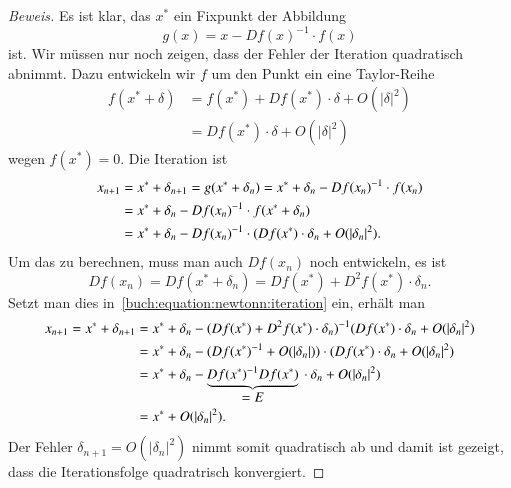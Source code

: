 \begin{proof}[Beweis]
Es ist klar, das $x^*$ ein Fixpunkt der Abbildung
\[
g(x)=x-Df(x)^{-1}\cdot f(x)
\]
ist.
Wir müssen nur noch zeigen, dass der Fehler der Iteration quadratisch
abnimmt.
Dazu entwickeln wir $f$ um den Punkt ein eine Taylor-Reihe
\begin{align*}
f(x^* + \delta)
&=
f(x^*) + Df(x^*)\cdot \delta + O(|\delta|^2)
\\
&=
Df(x^*)\cdot \delta + O(|\delta|^2)
\end{align*}
wegen $f(x^*)=0$.
Die Iteration ist
\begin{align}
x_{n+1}
&=
x^* +\delta_{n+1}
=
g(x^*+\delta_n)
=
x^*+\delta_n  - Df(x_n)^{-1}\cdot f(x_n)
\notag
\\
&=
x^* + \delta_n -Df(x_n)^{-1}\cdot f(x^* + \delta_n)
\notag
\\
&=
x^* + \delta_n -Df(x_n)^{-1}\cdot
(Df(x^*)\cdot \delta_n + O(|\delta_n|^2).
\label{buch:equation:newtonn:iteration}
\end{align}
Um das zu berechnen, muss man auch $Df(x_n)$ noch entwickeln, es ist
\[
Df(x_n)
=
Df(x^*+\delta_n)
=
Df(x^*) + D^2f(x^*)\cdot\delta_n.
\]
Setzt man dies in~\eqref{buch:equation:newtonn:iteration} ein, erhält man
\begin{align*}
x_{n+1}
=
x^*+\delta_{n+1}
&=
x^* + \delta_n -
(Df(x^*) + D^2f(x^*)\cdot\delta_n)^{-1}
(Df(x^*)\cdot \delta_n + O(|\delta_n|^2)
\\
&=
x^* + \delta_n -
(Df(x^*)^{-1} + O(|\delta_n|))
\cdot
(Df(x^*)\cdot \delta_n + O(|\delta_n|^2)
\\
&=
x^* + \delta_n
- \underbrace{Df(x^*)^{-1}Df(x^*)}_{\displaystyle = E}\mathstrut\cdot\delta_n
+
O(|\delta_n|^2)
\\
&=x^* + O(|\delta_n|^2).
\end{align*}
Der Fehler $\delta_{n+1}=O(|\delta_n|^2)$ nimmt somit quadratisch ab
und damit ist gezeigt, dass die Iterationsfolge quadratrisch
konvergiert.
\end{proof}

